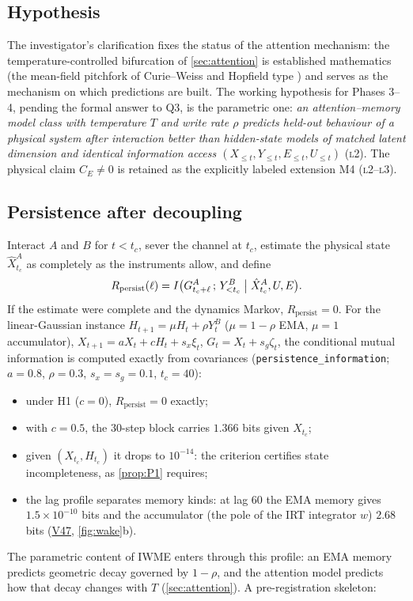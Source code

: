 \documentclass[11pt]{article}
\theoremstyle{definition}
\theoremstyle{remark}
\newcommand{\lvl}[1]{\textsc{l}#1}
\newcommand{\code}[1]{\texttt{#1}}
\newcommand{\V}[1]{\hyperref[app:verify]{\textsf{#1}}}
\begin{document}
\subsection{Hypothesis}\label{sec:hypothesis}
The investigator's clarification fixes the status of the attention mechanism: the temperature-controlled bifurcation of \cref{sec:attention} is established mathematics (the mean-field pitchfork of Curie--Weiss and Hopfield type \cite{Hopfield1982}) and serves as the mechanism on which predictions are built. The working hypothesis for Phases 3--4, pending the formal answer to Q3, is the parametric one: \emph{an attention--memory model class with temperature $T$ and write rate $\rho$ predicts held-out behaviour of a physical system after interaction better than hidden-state models of matched latent dimension and identical information access $(X_{\le t},Y_{\le t},E_{\le t},U_{\le t})$} (\lvl{2}). The physical claim $C_E\ne0$ is retained as the explicitly labeled extension M4 (\lvl{2}--\lvl{3}).

\subsection{Persistence after decoupling}\label{sec:persist}
Interact $A$ and $B$ for $t<t_c$, sever the channel at $t_c$, estimate the physical state $\hat X^A_{t_c}$ as completely as the instruments allow, and define
\begin{equation}
R_{\mathrm{persist}}(\ell)=I\bigl(G^A_{t_c+\ell}\,;\,Y^B_{<t_c}\bigm\vert\hat X^A_{t_c},U,E\bigr).
\end{equation}
If the estimate were complete and the dynamics Markov, $R_{\mathrm{persist}}=0$. For the linear-Gaussian instance $H_{t+1}=\mu H_t+\rho Y^B_t$ ($\mu=1-\rho$ EMA, $\mu=1$ accumulator), $X_{t+1}=aX_t+cH_t+s_x\xi_t$, $G_t=X_t+s_g\zeta_t$, the conditional mutual information is computed exactly from covariances (\code{persistence\_information}; $a=0.8$, $\rho=0.3$, $s_x=s_g=0.1$, $t_c=40$):
\begin{itemize}
\item under H1 ($c=0$), $R_{\mathrm{persist}}=0$ exactly;
\item with $c=0.5$, the 30-step block carries $1.366$ bits given $X_{t_c}$;
\item given $(X_{t_c},H_{t_c})$ it drops to $10^{-14}$: the criterion certifies state incompleteness, as \cref{prop:P1} requires;
\item the lag profile separates memory kinds: at lag 60 the EMA memory gives $1.5\times10^{-10}$ bits and the accumulator (the pole of the IRT integrator $w$) $2.68$ bits (\V{V47}, \cref{fig:wake}b).
\end{itemize}
The parametric content of IWME enters through this profile: an EMA memory predicts geometric decay governed by $1-\rho$, and the attention model predicts how that decay changes with $T$ (\cref{sec:attention}). A pre-registration skeleton:
\end{document}

